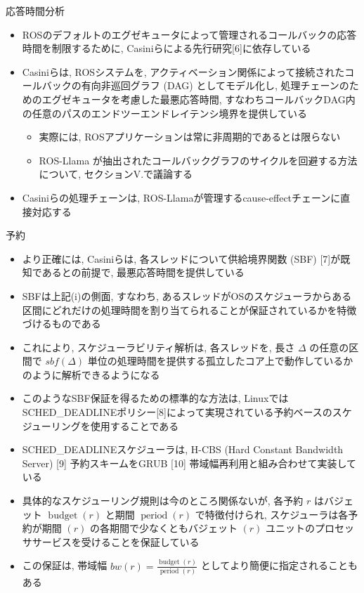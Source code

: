 \begin{frame}{応答時間分析}
    \begin{itemize}
        \item ROSのデフォルトのエグゼキュータによって管理されるコールバックの応答時間を制限するために, Casiniらによる先行研究[6]に依存している
        \item Casiniらは, ROSシステムを, アクティベーション関係によって接続されたコールバックの有向非巡回グラフ (DAG) としてモデル化し, 処理チェーンのためのエグゼキュータを考慮した最悪応答時間, すなわちコールバックDAG内の任意のパスのエンドツーエンドレイテンシ境界を提供している
              \begin{itemize}
                  \item 実際には, ROSアプリケーションは常に非周期的であるとは限らない
                  \item ROS-Llama が抽出されたコールバックグラフのサイクルを回避する方法について, セクションV.で議論する
              \end{itemize}
        \item Casiniらの処理チェーンは, ROS-Llamaが管理するcause-effectチェーンに直接対応する
    \end{itemize}
\end{frame}

\begin{frame}{予約}
    \begin{itemize}
        \item より正確には, Casiniらは, 各スレッドについて供給境界関数 (SBF) [7]が既知であるとの前提で, 最悪応答時間を提供している
        \item SBFは上記(i)の側面, すなわち, あるスレッドがOSのスケジューラからある区間にどれだけの処理時間を割り当てられることが保証されているかを特徴づけるものである
        \item これにより, スケジューラビリティ解析は, 各スレッドを, 長さ $\Delta$ の任意の区間で $s b f(\Delta)$ 単位の処理時間を提供する孤立したコア上で動作しているかのように解析できるようになる
        \item このようなSBF保証を得るための標準的な方法は, LinuxではSCHED\_DEADLINEポリシー[8]によって実現されている予約ベースのスケジューリングを使用することである
    \end{itemize}
\end{frame}

\begin{frame}{}
    \begin{itemize}
        \item SCHED\_DEADLINEスケジューラは, H-CBS (Hard Constant Bandwidth Server) [9] 予約スキームをGRUB [10] 帯域幅再利用と組み合わせて実装している
        \item 具体的なスケジューリング規則は今のところ関係ないが, 各予約 $r$ はバジェット $\operatorname{budget}(r)$ と期間 $\operatorname{period}(r)$ で特徴付けられ, スケジューラは各予約が期間 $(r)$ の各期間で少なくともバジェット $(r)$ ユニットのプロセッササービスを受けることを保証している
        \item この保証は, 帯域幅 $b w(r)=\frac{\operatorname{budget}(r)}{\text { period }(r)}$ としてより簡便に指定されることもある
    \end{itemize}
\end{frame}

